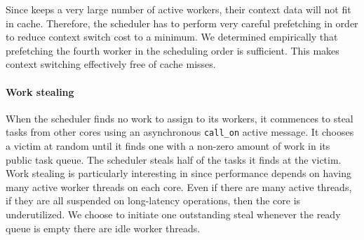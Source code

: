 Since \Grappa keeps a very large number of active workers, their context data will not fit in cache. Therefore, the scheduler has to perform very careful prefetching in order to reduce context switch cost to a minimum. We determined empirically that prefetching the fourth worker in the scheduling order is sufficient. This makes context switching effectively free of cache misses. 

% 
% 
% 






\paragraph{Work stealing} 
When the scheduler finds no work to assign to its workers, it commences to
steal tasks from other cores using an asynchronous \texttt{call\_on} active
message. It chooses a victim at random until it finds one with a non-zero
amount of work in its public task queue. The scheduler steals half of the
tasks it finds at the victim. Work stealing is particularly interesting in
\Grappa since performance depends on having many active worker threads on each
core. Even if there are many active threads, if they are all suspended on
long-latency operations, then the core is underutilized. We choose to initiate
one outstanding steal whenever the ready queue is empty there are idle worker
threads.

